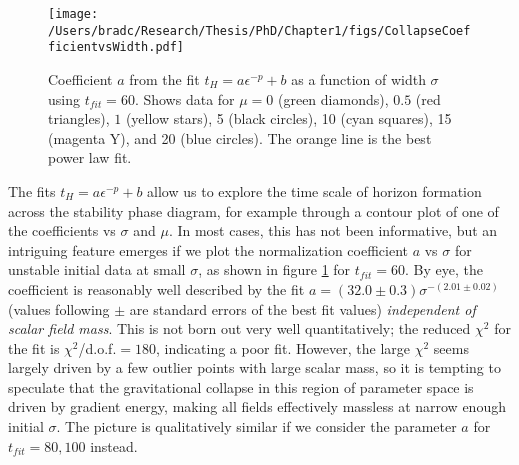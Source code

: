 \documentclass[../PhD.tex]{subfiles}
\begin{document}
\begin{figure}[t]
\centering
\texttt{[image: /Users/bradc/Research/Thesis/PhD/Chapter1/figs/CollapseCoefficientvsWidth.pdf]}
\caption[Fitting the leading coefficient of $t_H = a\epsilon^{-p} + b$ as a function of initial data width]{Coefficient $a$ from the fit $t_H=a\epsilon^{-p}+b$ as a function
of width $\sigma$ using $t_{fit}=60$. 
Shows data for $\mu=0$ (green diamonds), $0.5$ 
(red triangles), $1$ (yellow stars), 5 (black circles), 10 (cyan squares),
15 (magenta Y), and 20 (blue circles).  The orange line is the best 
power law fit.}
\label{f:unstable}
\end{figure}

The fits $t_H=a\epsilon^{-p}+b$ allow us to explore the time scale of 
horizon formation across the stability phase diagram, 
for example through a contour
plot of one of the coefficients vs $\sigma$ and $\mu$.  In most cases,
this has not been informative, but an intriguing feature emerges if we
plot the normalization coefficient $a$ vs $\sigma$ for unstable initial 
data at small $\sigma$, as shown in figure \ref{f:unstable} for $t_{fit}=60$.  
By eye, the coefficient is reasonably well described by the fit
$a=(32.0\pm 0.3) \sigma^{-(2.01\pm 0.02)}$ (values following $\pm$ 
are standard errors of
the best fit values) \textit{independent of scalar field mass}.
This is not born out very well quantitatively; the reduced $\chi^2$ for the
fit is $\chi^2$/d.o.f.$=180$, indicating a poor fit.  However, the large
$\chi^2$ seems largely driven by a few outlier points with large
scalar mass, so it is tempting
to speculate that the gravitational collapse in this region of parameter
space is driven by gradient energy, making all fields effectively massless
at narrow enough initial $\sigma$.  The picture is qualitatively similar
if we consider the parameter $a$ for $t_{fit}=80,100$ instead.
\end{document}

